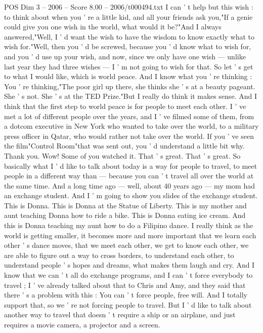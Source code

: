 \begin{textsample}{POS Dim 3 – 2006 – Score 8.00 – 2006/t000494.txt}  \label{ex:f3_pos_067}
I can ' t help but this wish : to think about when you ' re a little kid, and all your friends ask you,"If a genie could give you one wish in the world, what would it be?"And I always answered,"Well, I ' d want the wish to have the wisdom to know exactly what to wish for."Well, then you ' d be screwed, because you ' d know what to wish for, and you ' d use up your wish, and now, since we only have one wish — unlike last year they had three wishes — I ' m not going to wish for that.
So let ' s get to what I would like, which is world peace.
And I know what you ' re thinking : You ' re thinking,"The poor girl up there, she thinks she ' s at a beauty pageant.
She ' s not.
She ' s at the TED Prize."But I really do think it makes sense.
And I think that the first step to world peace is for people to meet each other.
I ' ve met a lot of different people over the years, and I ' ve filmed some of them, from a dotcom executive in New York who wanted to take over the world, to a military press officer in Qatar, who would rather not take over the world.
If you ' ve seen the film"Control Room"that was sent out, you ' d understand a little bit why.
Thank you.
Wow!
Some of you watched it.
That ' s great.
That ' s great.
So basically what I ' d like to talk about today is a way for people to travel, to meet people in a different way than — because you can ' t travel all over the world at the same time.
And a long time ago — well, about 40 years ago — my mom had an exchange student.
And I ' m going to show you slides of the exchange student.
This is Donna.
This is Donna at the Statue of Liberty.
This is my mother and aunt teaching Donna how to ride a bike.
This is Donna eating ice cream.
And this is Donna teaching my aunt how to do a Filipino dance.
I really think as the world is getting smaller, it becomes more and more important that we learn each other ' s dance moves, that we meet each other, we get to know each other, we are able to figure out a way to cross borders, to understand each other, to understand people ' s hopes and dreams, what makes them laugh and cry.
And I know that we can ' t all do exchange programs, and I can ' t force everybody to travel ; I ' ve already talked about that to Chris and Amy, and they said that there ' s a problem with this : You can ' t force people, free will.
And I totally support that, so we ' re not forcing people to travel.
But I ' d like to talk about another way to travel that doesn ' t require a ship or an airplane, and just requires a movie camera, a projector and a screen.

\end{textsample}
